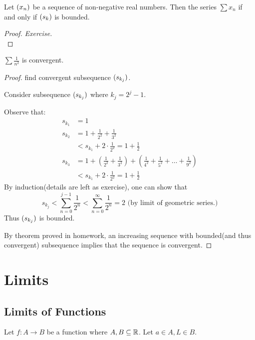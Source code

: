 \documentclass[a4paper,12pt]{article}
\begin{document}
\begin{theorem}
    Let \((x _{n })\) be a sequence of non-negative real numbers. Then the series \(\sum x_n \)  if and only if \((s _{k })\) is bounded.
    \begin{proof}
        \textit{Exercise.\\}
    \end{proof}
    \begin{example}
        \(\sum \frac{1}{n^2}\) is convergent.

        \begin{proof}
             find convergent subsequence \((s _{k_j })\).

            Consider subsequence \((s _{k_j })\) where \(k_j=2^j-1 \).

            Observe that:
            \begin{align*}
                s_{k_1}&=1\\
                s_{k_2}&=1+\frac{1}{2^2}+\frac{1}{3^2}\\&<s_{k_1}+2\cdot \frac{1}{2^2}=1+\frac{1}{2}\\
                s_{k_3}&=1+(\frac{1}{2^2}+\frac{1}{3^2})+(\frac{1}{4^2}+\frac{1}{5^2}+\dots+\frac{1}{9^2})\\&<s_{k_1}+2\cdot \frac{1}{2^2}=1+\frac{1}{2}
            \end{align*}
            By induction(details are left as exercise), one can show that 
            \[s_{k_j}<\sum_{n=0}^{j-1}\frac{1}{2^n }<\sum_{n=0}^{\infty}\frac{1}{2^n}=2\text{ (by limit of geometric series.)}\]
            Thus \((s _{k_j })\) is bounded.

            By theorem proved in homework, an increasing sequence with bounded(and thus convergent) subsequence implies that the sequence is convergent.
        \end{proof}
    \end{example}
\end{theorem}


\newpage

\section{Limits}

\subsection{Limits of Functions}
Let \(f:A\rightarrow B\) be a function where \(A,B\subseteq \mathbb{R}\). Let \(a\in A,L\in B\).
\end{document}

